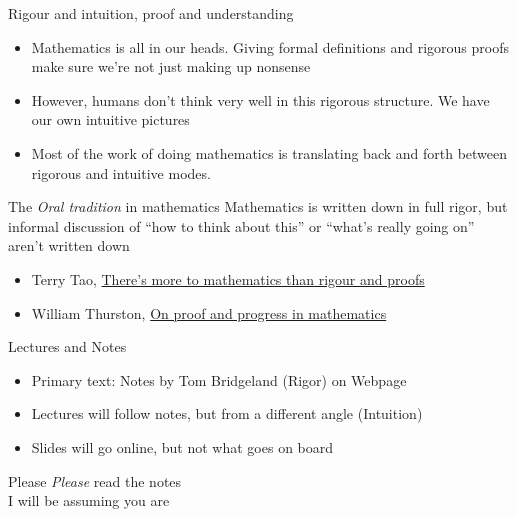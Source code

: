 \documentclass{beamer}
\begin{document}
\begin{frame}{Rigour and intuition, proof and understanding}

\begin{itemize}
\item Mathematics is all in our heads.  Giving formal definitions and rigorous proofs make sure we're not just making up nonsense
\item However, humans don't think very well in this rigorous structure.  We have our own intuitive pictures
\item Most of the work of doing mathematics is translating back and forth between rigorous and intuitive modes.
\end{itemize}


\begin{block}{The \emph{Oral tradition} in mathematics}
Mathematics is written down in full rigor, but informal discussion of ``how to think about this'' or  ``what's really going on'' aren't written down
\end{block}


\begin{itemize}
\item Terry Tao, \href{https://terrytao.wordpress.com/career-advice/there’s-more-to-mathematics-than-rigour-and-proofs/}{There's more to mathematics than rigour and proofs}
\item William Thurston, \href{https://arxiv.org/abs/math/9404236}{On proof and progress in mathematics}
\end{itemize}


\end{frame}


\begin{frame}{Lectures and Notes}
\begin{itemize}
\item  Primary text: Notes by Tom Bridgeland (Rigor) on Webpage
\item  Lectures will follow notes, but from a different angle (Intuition)
\item  Slides will go online, but not what goes on board
\end{itemize}

\end{frame}



\begin{frame}[plain,c]

\begin{center}

\Huge

Please \emph{Please} read the notes \\
I will be assuming you are
\end{center}

\end{frame}
\end{document}
